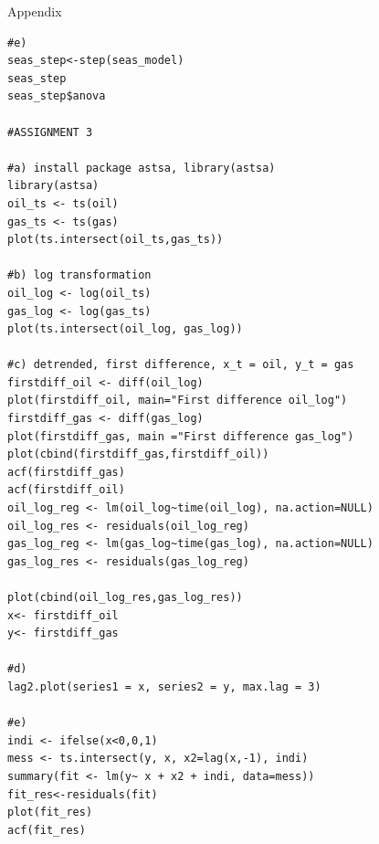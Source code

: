 \documentclass{article}
\begin{document}
\begin{section}{Appendix}
\begin{verbatim}
#e)
seas_step<-step(seas_model)
seas_step
seas_step$anova

#ASSIGNMENT 3

#a) install package astsa, library(astsa)
library(astsa)
oil_ts <- ts(oil)
gas_ts <- ts(gas)
plot(ts.intersect(oil_ts,gas_ts))

#b) log transformation
oil_log <- log(oil_ts)
gas_log <- log(gas_ts)
plot(ts.intersect(oil_log, gas_log))

#c) detrended, first difference, x_t = oil, y_t = gas
firstdiff_oil <- diff(oil_log)
plot(firstdiff_oil, main="First difference oil_log")
firstdiff_gas <- diff(gas_log)
plot(firstdiff_gas, main ="First difference gas_log")
plot(cbind(firstdiff_gas,firstdiff_oil))
acf(firstdiff_gas)
acf(firstdiff_oil)
oil_log_reg <- lm(oil_log~time(oil_log), na.action=NULL)
oil_log_res <- residuals(oil_log_reg)
gas_log_reg <- lm(gas_log~time(gas_log), na.action=NULL)
gas_log_res <- residuals(gas_log_reg)

plot(cbind(oil_log_res,gas_log_res))
x<- firstdiff_oil
y<- firstdiff_gas

#d)
lag2.plot(series1 = x, series2 = y, max.lag = 3)

#e)
indi <- ifelse(x<0,0,1)
mess <- ts.intersect(y, x, x2=lag(x,-1), indi)
summary(fit <- lm(y~ x + x2 + indi, data=mess))
fit_res<-residuals(fit)
plot(fit_res)
acf(fit_res)

\end{verbatim}
\end{section}
\end{document}
